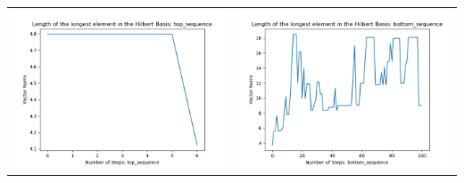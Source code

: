 \documentclass[10pt]{article}
\begin{document}
\begin{tabular}{c|c}
\begin{minipage}{.45\textwidth}
\includegraphics[width=\textwidth]{"DATA/5d/5 generators 2 bound B/top_sequence LENGTH"}
\end{minipage} &
\begin{minipage}{.45\textwidth}
\includegraphics[width=\textwidth]{"DATA/5d/5 generators 2 bound B bottomup/bottom_sequence LENGTH"}
\end{minipage}
\end{tabular}
\end{document}
